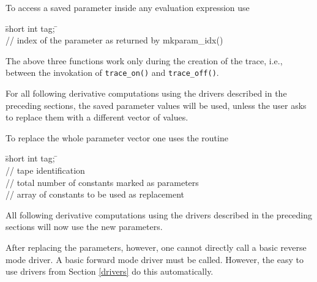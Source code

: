 \documentclass[11pt,twoside]{article}
\begin{document}
To access a saved parameter inside any evaluation expression use
\begin{tabbing}
\hspace{0.5in}\={\sf short int tag;} \hspace{1.1in}\= \kill    %
\\
 \> // index of the parameter as returned by
mkparam\_idx()\\
\end{tabbing}

The above three functions work only during the creation of the trace,
i.e., between the invokation of \verb=trace_on()= and \verb=trace_off()=.

For all following derivative computations using the drivers described
in the preceding sections, the saved parameter values will be used,
unless the user asks to replace them with a different vector of
values.

To replace the whole parameter vector one uses the routine
\begin{tabbing}
\hspace{0.5in}\={\sf short int tag;} \hspace{1.1in}\= \kill    %
\\
   \> // tape identification\\
  \> // total number of constants marked as
parameters\\
 \> // array of constants to be used as replacement\\
\end{tabbing}
All following derivative computations using the drivers described in
the preceding sections will now use the new parameters. 

After replacing the parameters, however, one cannot directly call a basic
reverse mode driver. A basic forward mode driver must be called. However,
the easy to use drivers from Section \ref{drivers} do this automatically.
%
\end{document}
